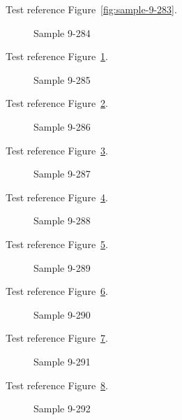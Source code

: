 Test reference Figure~\ref{fig:sample-9-283}.

\begin{figure}[tbhp]
\caption{Sample 9-284}
\label{fig:sample-9-284}
\end{figure}

Test reference Figure~\ref{fig:sample-9-284}.

\begin{figure}[tbhp]
\caption{Sample 9-285}
\label{fig:sample-9-285}
\end{figure}

Test reference Figure~\ref{fig:sample-9-285}.

\begin{figure}[tbhp]
\caption{Sample 9-286}
\label{fig:sample-9-286}
\end{figure}

Test reference Figure~\ref{fig:sample-9-286}.

\begin{figure}[tbhp]
\caption{Sample 9-287}
\label{fig:sample-9-287}
\end{figure}

Test reference Figure~\ref{fig:sample-9-287}.

\begin{figure}[tbhp]
\caption{Sample 9-288}
\label{fig:sample-9-288}
\end{figure}

Test reference Figure~\ref{fig:sample-9-288}.

\begin{figure}[tbhp]
\caption{Sample 9-289}
\label{fig:sample-9-289}
\end{figure}

Test reference Figure~\ref{fig:sample-9-289}.

\begin{figure}[tbhp]
\caption{Sample 9-290}
\label{fig:sample-9-290}
\end{figure}

Test reference Figure~\ref{fig:sample-9-290}.

\begin{figure}[tbhp]
\caption{Sample 9-291}
\label{fig:sample-9-291}
\end{figure}

Test reference Figure~\ref{fig:sample-9-291}.

\begin{figure}[tbhp]
\caption{Sample 9-292}
\label{fig:sample-9-292}
\end{figure}

